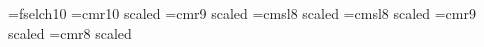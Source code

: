 %
%
%
%


\font\chessfont=fselch10
%
\font\numberfont=cmr10 scaled 
\font\authorfont=cmr9 scaled 
\font\origfont=cmsl8 scaled 
\font\dedicfont=cmsl8 scaled 
\font\stipfont=cmr9 scaled 
\font\remfont=cmr8 scaled 

%
\newcount\boardnumber{}%
\newcount\solnumber{}%
\newcount\whitecnt
\newcount\blackcnt
\newcount\neutrcnt

